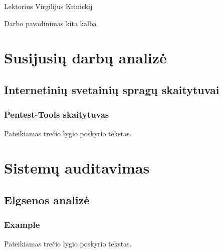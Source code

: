 \documentclass[a4paper,12pt,fleqn]{article}
\begin{document}
 {}{}{}{}%
 {Lektorius Virgilijus Krinickij}

\tableofcontents



\bothabstracts{}%
{Darbo pavadinimas kita kalba} %
{}%






\newpage
\section{Susijusių darbų analizė}
\label{sec:motivation}

\subsection{Internetinių svetainių spragų skaitytuvai}
\label{sec:example}

\subsubsection{Pentest-Tools skaitytuvas}
\label{sec:data}
Pateikiamas trečio lygio poskyrio tekstas.



\newpage
\section{Sistemų auditavimas}
\label{sec:motivation}

\subsection{Elgsenos analizė}
\label{sec:example}

\subsubsection{Example}
\label{sec:data}
Pateikiamas trečio lygio poskyrio tekstas.
\end{document}

